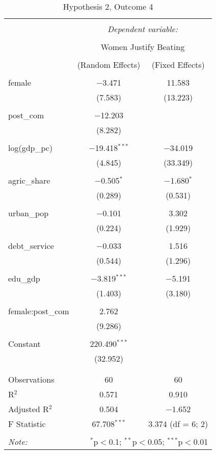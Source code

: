 \documentclass[12pt]{article}
\begin{document}
\begin{table}[!htbp] \centering 
  \caption{Hypothesis 2, Outcome 4} 
  \label{} 
\begin{tabular}{@{\extracolsep{5pt}}lcc} 
\\[-1.8ex]\hline 
\hline \\[-1.8ex] 
 & \multicolumn{2}{c}{\textit{Dependent variable:}} \\ 
\cline{2-3} 
\\[-1.8ex] & \multicolumn{2}{c}{Women Justify Beating} \\ 
\\[-1.8ex] & (Random Effects) & (Fixed Effects)\\ 
\hline \\[-1.8ex] 
 female & $-$3.471 & 11.583 \\ 
  & (7.583) & (13.223) \\ 
  & & \\ 
 post\_com & $-$12.203 &  \\ 
  & (8.282) &  \\ 
  & & \\ 
 log(gdp\_pc) & $-$19.418$^{***}$ & $-$34.019 \\ 
  & (4.845) & (33.349) \\ 
  & & \\ 
 agric\_share & $-$0.505$^{*}$ & $-$1.680$^{*}$ \\ 
  & (0.289) & (0.531) \\ 
  & & \\ 
 urban\_pop & $-$0.101 & 3.302 \\ 
  & (0.224) & (1.929) \\ 
  & & \\ 
 debt\_service & $-$0.033 & 1.516 \\ 
  & (0.544) & (1.296) \\ 
  & & \\ 
 edu\_gdp & $-$3.819$^{***}$ & $-$5.191 \\ 
  & (1.403) & (3.180) \\ 
  & & \\ 
 female:post\_com & 2.762 &  \\ 
  & (9.286) &  \\ 
  & & \\ 
 Constant & 220.490$^{***}$ &  \\ 
  & (32.952) &  \\ 
  & & \\ 
\hline \\[-1.8ex] 
Observations & 60 & 60 \\ 
R$^{2}$ & 0.571 & 0.910 \\ 
Adjusted R$^{2}$ & 0.504 & $-$1.652 \\ 
F Statistic & 67.708$^{***}$ & 3.374 (df = 6; 2) \\ 
\hline 
\hline \\[-1.8ex] 
\textit{Note:}  & \multicolumn{2}{r}{$^{*}$p$<$0.1; $^{**}$p$<$0.05; $^{***}$p$<$0.01} \\ 
\end{tabular} 
\end{table} 
\end{document}

